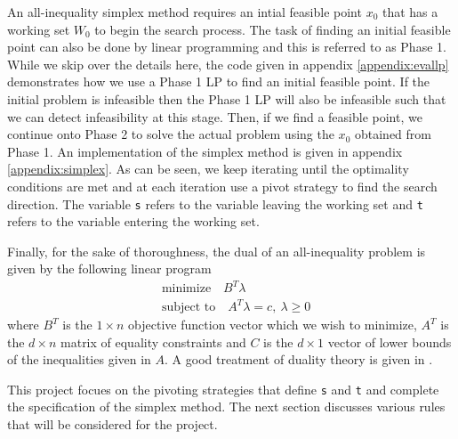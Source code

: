 \documentclass{standalone}
\begin{document}
An all-inequality simplex method requires an intial feasible point $x_{0}$ that has a working set $W_{0}$ to begin the search process. The task of finding an initial feasible point can also be done by linear programming and this is referred to as Phase 1. While we skip over the details here, the code given in appendix \ref{appendix:evallp}{} demonstrates how we use a Phase 1 LP to find an initial feasible point. If the initial problem is infeasible then the Phase 1 LP will also be infeasible such that we can detect infeasibility at this stage. Then, if we find a feasible point, we continue onto Phase 2 to solve the actual problem using the $x_{0}$ obtained from Phase 1. An implementation of the simplex method is given in appendix \ref{appendix:simplex}{}. As can be seen, we keep iterating until the optimality conditions are met and at each iteration use a pivot strategy to find the search direction. The variable \verb|s| refers to the variable leaving the working set and \verb|t| refers to the variable entering the working set.\par
Finally, for the sake of thoroughness, the dual of an all-inequality problem is given by the following linear program
\begin{align}
  &\text{minimize}\quad B^{T}\lambda \nonumber\\
  &\text{subject to}\quad A^{T}\lambda = c,\:\lambda\ge 0 \nonumber
\end{align}
where $B^{T}$ is the $1\times n$ objective function vector which we wish to minimize, $A^{T}$ is the $d\times n$ matrix of equality constraints and $C$ is the $d\times 1$ vector of lower bounds of the inequalities given in $A$. A good treatment of duality theory is given in \cite{sierksma2001linear}.\par
This project focues on the pivoting strategies that define \verb|s| and \verb|t| and complete the specification of the simplex method. The next section discusses various rules that will be considered for the project.
\end{document}
